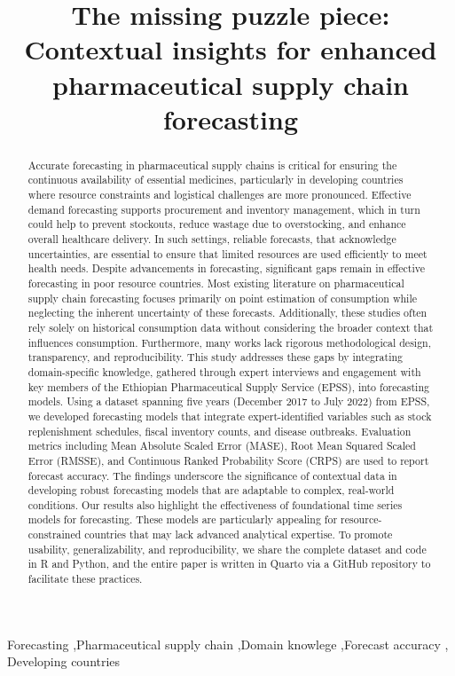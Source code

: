 \documentclass[
  authoryear,
  preprint,
  3p]{elsarticle}
\begin{document}
\begin{frontmatter}
\title{The missing puzzle piece: Contextual insights for enhanced
pharmaceutical supply chain forecasting}


        
\begin{abstract}
Accurate forecasting in pharmaceutical supply chains is critical for
ensuring the continuous availability of essential medicines,
particularly in developing countries where resource constraints and
logistical challenges are more pronounced. Effective demand forecasting
supports procurement and inventory management, which in turn could help
to prevent stockouts, reduce wastage due to overstocking, and enhance
overall healthcare delivery. In such settings, reliable forecasts, that
acknowledge uncertainties, are essential to ensure that limited
resources are used efficiently to meet health needs. Despite
advancements in forecasting, significant gaps remain in effective
forecasting in poor resource countries. Most existing literature on
pharmaceutical supply chain forecasting focuses primarily on point
estimation of consumption while neglecting the inherent uncertainty of
these forecasts. Additionally, these studies often rely solely on
historical consumption data without considering the broader context that
influences consumption. Furthermore, many works lack rigorous
methodological design, transparency, and reproducibility. This study
addresses these gaps by integrating domain-specific knowledge, gathered
through expert interviews and engagement with key members of the
Ethiopian Pharmaceutical Supply Service (EPSS), into forecasting models.
Using a dataset spanning five years (December 2017 to July 2022) from
EPSS, we developed forecasting models that integrate expert-identified
variables such as stock replenishment schedules, fiscal inventory
counts, and disease outbreaks. Evaluation metrics including Mean
Absolute Scaled Error (MASE), Root Mean Squared Scaled Error (RMSSE),
and Continuous Ranked Probability Score (CRPS) are used to report
forecast accuracy. The findings underscore the significance of
contextual data in developing robust forecasting models that are
adaptable to complex, real-world conditions. Our results also highlight
the effectiveness of foundational time series models for forecasting.
These models are particularly appealing for resource-constrained
countries that may lack advanced analytical expertise. To promote
usability, generalizability, and reproducibility, we share the complete
dataset and code in R and Python, and the entire paper is written in
Quarto via a GitHub repository to facilitate these practices.
\end{abstract}





\begin{keyword}
    Forecasting \sep Pharmaceutical supply chain \sep Domain
knowlege \sep Forecast accuracy \sep 
    Developing countries
\end{keyword}
\end{frontmatter}
    
\end{document}
